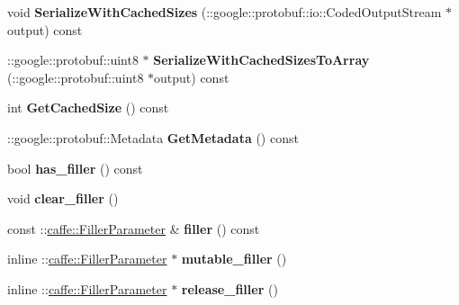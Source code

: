 \begin{DoxyCompactItemize}
void {\bfseries Serialize\+With\+Cached\+Sizes} (\+::google\+::protobuf\+::io\+::\+Coded\+Output\+Stream $\ast$output) const
\item 
\mbox{\label{classcaffe_1_1_p_re_l_u_parameter_a664337162265ed1eafaf95821bba5a90}} 
\+::google\+::protobuf\+::uint8 $\ast$ {\bfseries Serialize\+With\+Cached\+Sizes\+To\+Array} (\+::google\+::protobuf\+::uint8 $\ast$output) const
\item 
\mbox{\label{classcaffe_1_1_p_re_l_u_parameter_ae5951516108f7c7a4c235ab65889950a}} 
int {\bfseries Get\+Cached\+Size} () const
\item 
\mbox{\label{classcaffe_1_1_p_re_l_u_parameter_aa7d4d3e206d6b80e0d524ceaf339c040}} 
\+::google\+::protobuf\+::\+Metadata {\bfseries Get\+Metadata} () const
\item 
\mbox{\label{classcaffe_1_1_p_re_l_u_parameter_a6162e7f0794973a4ce5f137f428035a7}} 
bool {\bfseries has\+\_\+filler} () const
\item 
\mbox{\label{classcaffe_1_1_p_re_l_u_parameter_a991a232ed20e2cc09def03c9fe98ef57}} 
void {\bfseries clear\+\_\+filler} ()
\item 
\mbox{\label{classcaffe_1_1_p_re_l_u_parameter_af4dcbd141a35575a84b86c571ac5557b}} 
const \+::\mbox{\hyperlink{classcaffe_1_1_filler_parameter}{caffe\+::\+Filler\+Parameter}} \& {\bfseries filler} () const
\item 
\mbox{\label{classcaffe_1_1_p_re_l_u_parameter_a4472439eee46c05d147fddbea16f0bb0}} 
inline \+::\mbox{\hyperlink{classcaffe_1_1_filler_parameter}{caffe\+::\+Filler\+Parameter}} $\ast$ {\bfseries mutable\+\_\+filler} ()
\item 
\mbox{\label{classcaffe_1_1_p_re_l_u_parameter_a09913fbf6d8582e537126ff12303b0e1}} 
inline \+::\mbox{\hyperlink{classcaffe_1_1_filler_parameter}{caffe\+::\+Filler\+Parameter}} $\ast$ {\bfseries release\+\_\+filler} ()
\item 
\mbox{\label{classcaffe_1_1_p_re_l_u_parameter_af2c35394046d959cf1667b6472596c1b}} 

\end{DoxyCompactItemize}
